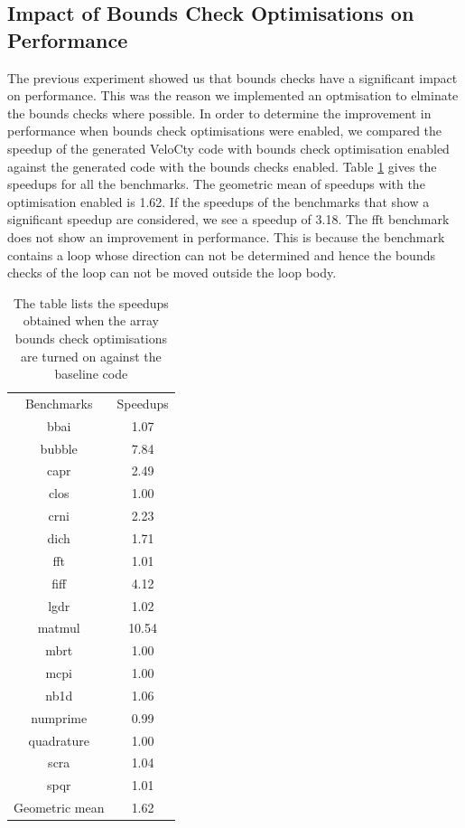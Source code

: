 \subsection{Impact of Bounds Check Optimisations on Performance}
The previous experiment showed us that bounds checks have a significant impact on performance. This was the reason we implemented an optmisation to elminate the bounds checks where possible. In order to determine the improvement in performance when bounds check optimisations were enabled, we compared the speedup of the generated VeloCty code with bounds check optimisation enabled  against the generated code with the bounds checks enabled. Table \ref{tab:CwvsCbc} gives the speedups for all the benchmarks. The geometric mean of speedups with the optimisation enabled is 1.62. If the speedups of the benchmarks that show a significant speedup are considered, we see a speedup of 3.18. The \textsf{fft} benchmark does not show an improvement in performance. This is because the benchmark contains a loop whose direction can not be determined and hence the bounds checks of the loop can not be moved outside the loop body.
\begin{table}[h]
\centering
\begin{tabular}{|c|c|}
\hline
Benchmarks     & Speedups \\ \hhline{|=|=|}
bbai           & 1.07     \\ \hline
bubble         & 7.84     \\ \hline
capr           & 2.49     \\ \hline
clos           & 1.00     \\ \hline
crni           & 2.23     \\ \hline
dich           & 1.71     \\ \hline
fft            & 1.01     \\ \hline
fiff           & 4.12     \\ \hline
lgdr           & 1.02     \\ \hline
matmul         & 10.54    \\ \hline
mbrt           & 1.00     \\ \hline
mcpi           & 1.00     \\ \hline
nb1d           & 1.06     \\ \hline
numprime       & 0.99     \\ \hline
quadrature     & 1.00     \\ \hline
scra           & 1.04     \\ \hline
spqr           & 1.01     \\ \hline
Geometric mean & 1.62     \\ \hline
\end{tabular}
\caption[Speedup of \velocty with bounds check optimisation turned on]{The table lists the speedups obtained when the array bounds check optimisations are turned on against the baseline \velocty code}
\label{tab:CwvsCbc}
\end{table}
